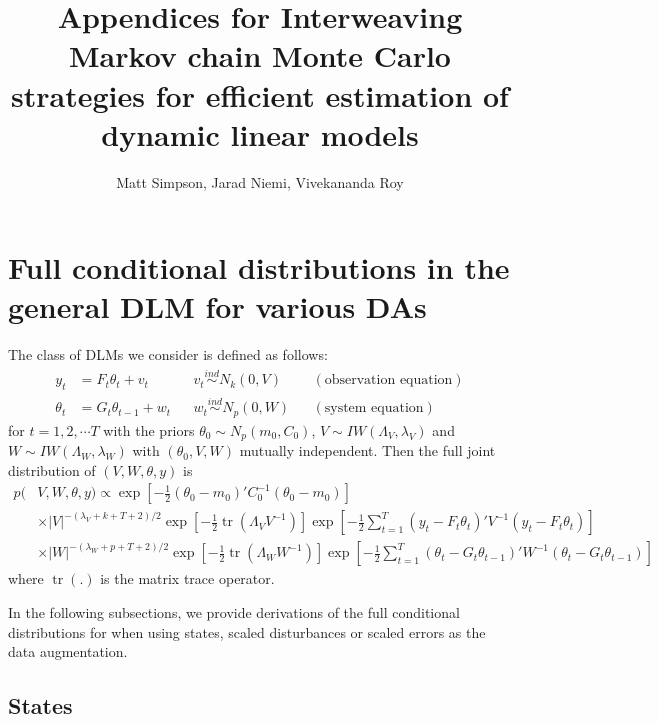 \documentclass{article}
\DeclareMathOperator{\tr}{tr}
\begin{document}
\title{Appendices for Interweaving Markov chain Monte Carlo strategies for efficient
estimation of dynamic linear models}
\author{Matt Simpson, Jarad Niemi, Vivekananda Roy}
\maketitle
\appendix
\section{Full conditional distributions in the general DLM for various DAs}\label{sec:DLMfullcond}

The class of DLMs we consider is defined as follows:
\begin{align}
y_t &= F_t\theta_t + v_t && v_t \stackrel{ind}{\sim} N_k(0,V) && (\mbox{observation equation}) \label{dlmtdobseq}\\
 \theta_t &= G_t\theta_{t-1} + w_t && w_t \stackrel{ind}{\sim} N_p(0,W) && (\mbox{system equation}) \label{dlmtdsyseq}
\end{align}
for $t=1,2,\cdots T$ with the priors $\theta_0 \sim N_p(m_0, C_0)$, $V \sim IW(\Lambda_V, \lambda_V)$ and $W \sim IW(\Lambda_W, \lambda_W)$ with $(\theta_0,V,W)$ mutually independent. Then the full joint distribution of $(V,W,\theta,y)$ is
\begin{align}
  p(&V,W,\theta,y) \propto \exp\left[-\frac{1}{2}(\theta_0-m_0)'C_0^{-1}(\theta_0-m_0)\right] \nonumber\\
  &\times   |V|^{-(\lambda_V + k + T + 2)/2}\exp\left[-\frac{1}{2}\tr\left(\Lambda_VV^{-1}\right)\right] \exp\left[-\frac{1}{2}\sum_{t=1}^T(y_t - F_t\theta_t)'V^{-1}(y_t - F_t\theta_t)\right] \nonumber\\
   & \times |W|^{-(\lambda_W + p + T + 2)/2}\exp\left[-\frac{1}{2}\tr\left(\Lambda_WW^{-1}\right)\right]\exp\left[-\frac{1}{2}\sum_{t=1}^T(\theta_t-G_t\theta_{t-1})'W^{-1}(\theta_t-G_t\theta_{t-1})\right]\label{dlmjoint}
 \end{align}
where $\tr(.)$ is the matrix trace operator.

In the following subsections, we provide derivations of the full conditional distributions for when using states, scaled disturbances or scaled errors as the data augmentation. 

\subsection{States}\label{subsec:states}
\end{document}
